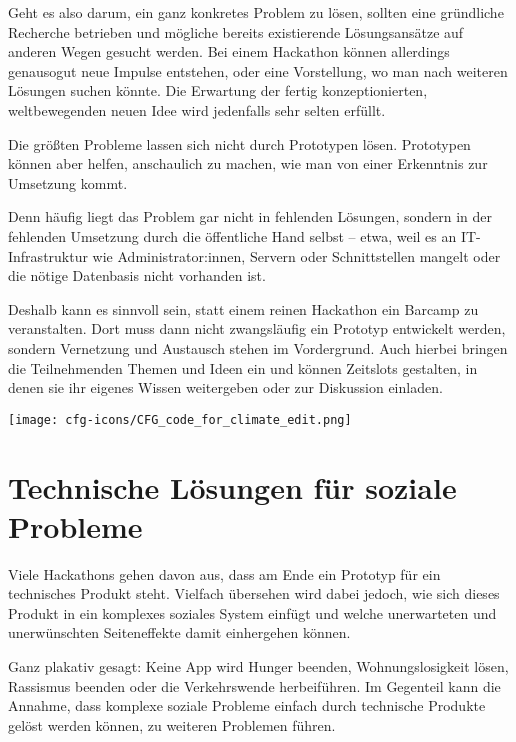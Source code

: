 Geht es also darum, ein ganz konkretes Problem zu lösen, sollten eine gründliche Recherche betrieben und mögliche bereits existierende Lösungsansätze auf anderen Wegen gesucht werden. Bei einem Hackathon können allerdings genausogut neue Impulse entstehen, oder eine Vorstellung, wo man nach weiteren Lösungen suchen könnte. Die Erwartung der fertig konzeptionierten, weltbewegenden neuen Idee wird jedenfalls sehr selten erfüllt.

\begin{kaobox}
	Die größten Probleme lassen sich nicht durch Prototypen lösen. Prototypen können aber helfen, anschaulich zu machen, wie man von einer Erkenntnis zur Umsetzung kommt.
\end{kaobox}

Denn häufig liegt das Problem gar nicht in fehlenden Lösungen, sondern in der fehlenden Umsetzung durch die öffentliche Hand selbst – etwa, weil es an IT-Infrastruktur wie Administrator:innen, Servern oder Schnittstellen mangelt oder die nötige Datenbasis nicht vorhanden ist.

Deshalb kann es sinnvoll sein, statt einem reinen Hackathon ein Barcamp zu veranstalten. Dort muss dann nicht zwangsläufig ein Prototyp entwickelt werden, sondern Vernetzung und Austausch stehen im Vordergrund. Auch hierbei bringen die Teilnehmenden Themen und Ideen ein und können Zeitslots gestalten, in denen sie ihr eigenes Wissen weitergeben oder zur Diskussion einladen.

\begin{marginfigure}[-6.5cm]
	\texttt{[image: cfg-icons/CFG\_code\_for\_climate\_edit.png]}
\end{marginfigure}


\section*{Technische Lösungen für soziale Probleme}

Viele Hackathons gehen davon aus, dass am Ende ein Prototyp für ein technisches Produkt steht. Vielfach übersehen wird dabei jedoch, wie sich dieses Produkt in ein komplexes soziales System einfügt und welche unerwarteten und unerwünschten Seiteneffekte damit einhergehen können.

Ganz plakativ gesagt: Keine App wird Hunger beenden, Wohnungslosigkeit lösen, Rassismus beenden oder die Verkehrswende herbeiführen. Im Gegenteil kann die Annahme, dass komplexe soziale Probleme einfach durch technische Produkte gelöst werden können, zu weiteren Problemen führen.

